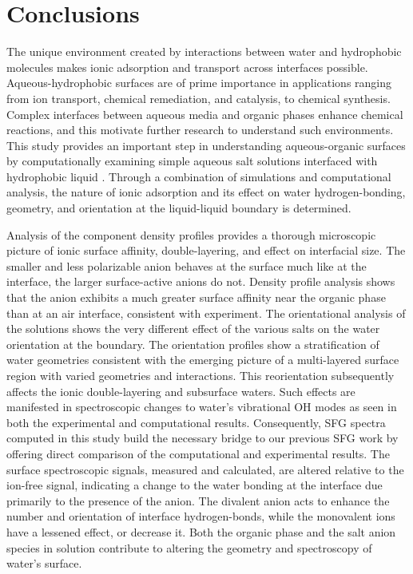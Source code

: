 \section{Conclusions}

The unique environment created by interactions between water and hydrophobic molecules makes ionic adsorption and transport across interfaces possible. Aqueous-hydrophobic surfaces are of prime importance in applications ranging from ion transport, chemical remediation, and catalysis, to chemical synthesis. Complex interfaces between aqueous media and organic phases enhance chemical reactions, and this motivate further research to understand such environments. This study provides an important step in understanding aqueous-organic surfaces by computationally examining simple aqueous salt solutions interfaced with hydrophobic liquid \ctc. Through a combination of simulations and computational analysis, the nature of ionic adsorption and its effect on water hydrogen-bonding, geometry, and orientation at the liquid-liquid boundary is determined.

Analysis of the component density profiles provides a thorough microscopic picture of ionic surface affinity, double-layering, and effect on interfacial size. The smaller and less polarizable \cl anion behaves at the \ctcwat surface much like at the \airwat interface, the larger surface-active anions do not. Density profile analysis shows that the \nit anion exhibits a much greater surface affinity near the organic phase than at an air interface, consistent with experiment. The orientational analysis of the solutions shows the very different effect of the various salts on the water orientation at the \ctcwat boundary. The orientation profiles show a stratification of water geometries consistent with the emerging picture of a multi-layered surface region with varied geometries and interactions. This reorientation subsequently affects the ionic double-layering and subsurface waters. Such effects are manifested in spectroscopic changes to water's vibrational OH modes as seen in both the experimental and computational results. Consequently, SFG spectra computed in this study build the necessary bridge to our previous SFG work by offering direct comparison of the computational and experimental results. The surface spectroscopic signals, measured and calculated, are altered relative to the ion-free signal, indicating a change to the water bonding at the interface due primarily to the presence of the anion. The divalent \sul anion acts to enhance the number and orientation of interface hydrogen-bonds, while the monovalent ions have a lessened effect, or decrease it. Both the organic phase and the salt anion species in solution contribute to altering the geometry and spectroscopy of water's surface. 

